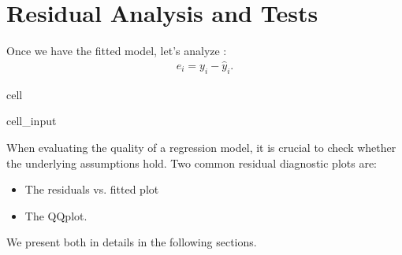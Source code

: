 \documentclass[letterpaper,10pt,english]{jupyterBook}
\begin{document}
\section{Residual Analysis and Tests}
\label{\detokenize{02:residual-analysis-and-tests}}
\sphinxAtStartPar
Once we have the fitted model, let’s analyze :
\begin{equation*}
\begin{split}
  e_i = y_i - \hat{y}_i.
\end{split}
\end{equation*}
\begin{sphinxuseclass}{cell}\begin{sphinxVerbatimInput}

\begin{sphinxuseclass}{cell_input}
\begin{sphinxVerbatim}[commandchars=\\\{\}]
  
  
\end{sphinxVerbatim}

\end{sphinxuseclass}\end{sphinxVerbatimInput}

\end{sphinxuseclass}
\sphinxAtStartPar
When evaluating the quality of a regression model, it is crucial to check whether the underlying assumptions hold. Two common residual diagnostic plots are:
\begin{itemize}
\item {} 
\sphinxAtStartPar
The residuals vs. fitted plot

\item {} 
\sphinxAtStartPar
The QQ\sphinxhyphen{}plot.

\end{itemize}

\sphinxAtStartPar
We present both in details in the following sections.
\end{document}
